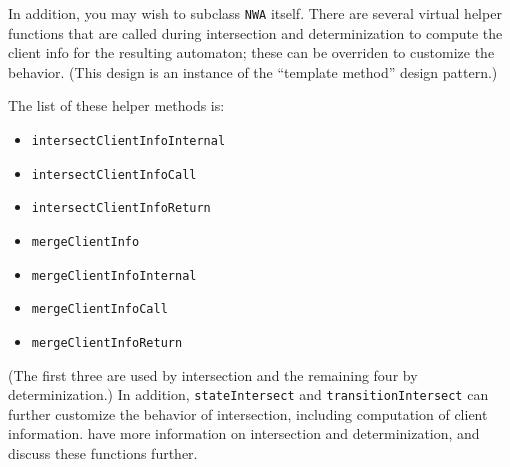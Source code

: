 \vspace{\baselineskip}
In addition, you may wish to subclass \texttt{NWA} itself. There are several
virtual helper functions that are called during intersection and
determinization to compute the client info for the resulting automaton; these
can be overriden to customize the behavior. (This design is an instance
of the ``template method'' design pattern.)

The list of these helper methods is:
\begin{itemize}
  \item \texttt{intersectClientInfoInternal}
  \item \texttt{intersectClientInfoCall}
  \item \texttt{intersectClientInfoReturn}
  \item \texttt{mergeClientInfo}
  \item \texttt{mergeClientInfoInternal}
  \item \texttt{mergeClientInfoCall}
  \item \texttt{mergeClientInfoReturn}
\end{itemize}
(The first three are used by intersection and the remaining four by
determinization.) In addition, \texttt{stateIntersect} and
\texttt{transitionIntersect} can further customize the behavior of
intersection, including computation of client
information.  have more information on
intersection and determinization, and discuss these functions further.


